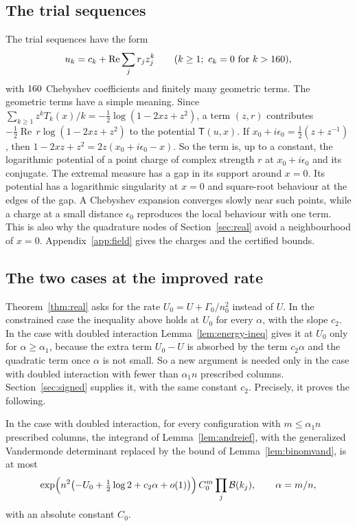 \subsection{The trial sequences}\label{ssec:trials}
The trial sequences have the form
\begin{equation}\label{eq:trial}
 u_k=c_k+\operatorname{Re}\sum_jr_jz_j^k\qquad(k\ge1;\ c_k=0\text{ for }k>160),
\end{equation}
with $160$ Chebyshev coefficients and finitely many geometric terms. The geometric terms have a simple
meaning. Since $\sum_{k\ge1}z^kT_k(x)/k=-\frac12\log(1-2xz+z^2)$, a term $(z,r)$ contributes
$-\frac12\operatorname{Re}\,r\log(1-2xz+z^2)$ to the potential $\mathsf T(u,x)$. If
$x_0+i\epsilon_0=\frac12(z+z^{-1})$, then $1-2xz+z^2=2z(x_0+i\epsilon_0-x)$. So the term is, up to a constant,
the logarithmic potential of a point charge of complex strength $r$ at $x_0+i\epsilon_0$ and its conjugate. The
extremal measure has a gap in its support around $x=0$. Its potential has a logarithmic singularity at $x=0$
and square-root behaviour at the edges of the gap. A Chebyshev expansion converges slowly near such points,
while a charge at a small distance $\epsilon_0$ reproduces the local behaviour with one term. This is also why
the quadrature nodes of Section~\ref{sec:real} avoid a neighbourhood of $x=0$. Appendix~\ref{app:field} gives the charges
and the certified bounds.

\subsection{The two cases at the improved rate}\label{ssec:cases}
Theorem~\ref{thm:real} asks for the rate $U_0=U+\Gamma_0/n_0^2$ instead of $U$. In the constrained case the
inequality above holds at $U_0$ for every $\alpha$, with the slope $c_2$. In the case with doubled interaction
Lemma~\ref{lem:energy-ineq} gives it at $U_0$ only for $\alpha\ge\alpha_1$, because the extra term $U_0-U$ is
absorbed by the term $c_2\alpha$ and the quadratic term once $\alpha$ is not small. So a new argument is needed
only in the case with doubled interaction with fewer than $\alpha_1n$ prescribed columns.
Section~\ref{sec:signed} supplies it, with the same constant $c_2$. Precisely, it proves the following.

\begin{proposition}\label{prop:signed-goal}
In the case with doubled interaction, for every configuration with $m\le\alpha_1n$ prescribed columns, the
integrand of Lemma~\ref{lem:andreief}, with the generalized Vandermonde determinant replaced by the bound of
Lemma~\ref{lem:binomvand}, is at most
\[
 \exp\Bigl(n^2\bigl(-U_0+\tfrac12\log2+c_2\alpha+o(1)\bigr)\Bigr)\,C_0^m\prod_j\mathcal B(k_j),\qquad \alpha=m/n,
\]
with an absolute constant $C_0$.
\end{proposition}

